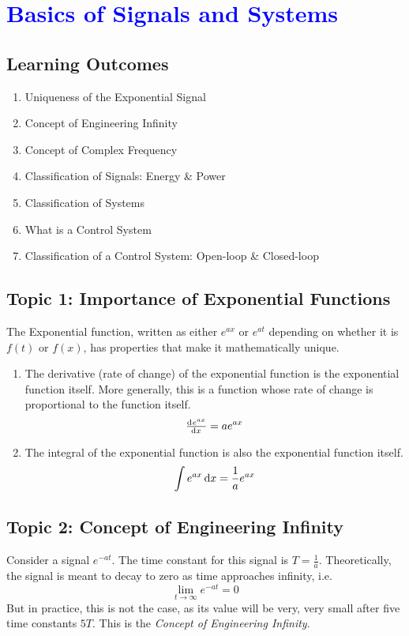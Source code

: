 \documentclass[../notes-main.tex]{subfiles}
\begin{document}
\chapter{\textcolor{blue}{Basics of Signals and Systems}}
\section*{Learning Outcomes}
\begin{enumerate}[label=\blacktriangleright, leftmargin=*, itemsep=0.5em]
    \item Uniqueness of the Exponential Signal
    \item Concept of Engineering Infinity
    \item Concept of Complex Frequency
    \item Classification of Signals: Energy \& Power
    \item Classification of Systems
    \item What is a Control System
    \item Classification of a Control System: Open-loop \& Closed-loop
\end{enumerate}
\newpage
\section{Topic 1: Importance of Exponential Functions}
The Exponential function, written as either
\(e^{ax}\) or \(e^{at}\) depending on whether it is \(f(t)\) or \(f(x)\),
has properties that make it mathematically unique.

\begin{enumerate}
    \item The derivative (rate of change) of the exponential function is the exponential function itself. More generally, this is a function whose rate of change is proportional to the function itself.
          \[
              \od{e^{ax}}{x} = ae^{ax}
          \]
    \item The integral of the exponential function is also the exponential function itself.
          \[
              \int e^{ax} \dif x = \frac{1}{a}e^{ax}
          \]
\end{enumerate}

\section{Topic 2: Concept of Engineering Infinity}
Consider a signal \(e^{-at}\). The time constant for this signal is \(T = \frac{1}{a}\). Theoretically, the signal is meant to decay to zero as time approaches infinity, i.e.
\[ 
    \lim_{t \to \infty} e^{-at} = 0 
\]
But in practice, this is not the case, as its value will be very, very small after five time constants \(5T\). This is the \emph{Concept of Engineering Infinity}.
\end{document}
